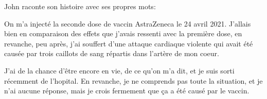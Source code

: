 John raconte son histoire avec ses propres mots:
  
On m'a injecté la seconde dose de vaccin AstraZeneca le 24 avril 2021. J'allais
bien en comparaison des effets que j'avais ressenti avec la première dose, en
revanche, peu après, j'ai souffert d'une attaque cardiaque violente qui avait
été causée par trois caillots de sang répartis dans l'artère de mon coeur.

J'ai de la chance d'être encore en vie, de ce qu'on m'a dit, et je suis sorti
récemment de l'hopital. En revanche, je ne comprends pas toute la situation, et
je n'ai aucune réponse, mais je crois fermement que ça a été causé par le
vaccin.

